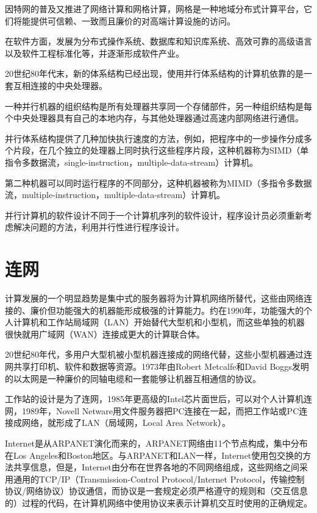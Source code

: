 因特网的普及又推进了网络计算和网格计算，网格是一种地域分布式计算平台，它们将能提供可信赖、一致而且廉价的对高端计算设施的访问。

在软件方面，发展为分布式操作系统、数据库和知识库系统、高效可靠的高级语言以及软件工程标准化等，并逐渐形成软件产业。

20世纪80年代末，新的体系结构已经出现，使用并行体系结构的计算机依靠的是一套互相连接的中央处理器。

一种并行机器的组织结构是所有处理器共享同一个存储部件，另一种组织结构是每个中央处理器具有自己的本地内存，与其他处理器通过高速内部网络进行通信。

并行体系结构提供了几种加快执行速度的方法，例如，把程序中的一步操作分成多个片段，在几个独立的处理器上同时执行这些程序片段，这种机器称为SIMD（单指令多数据流，single-instruction，multiple-data-stream）计算机。

第二种机器可以同时运行程序的不同部分，这种机器被称为MIMD（多指令多数据流，multiple-instruction，multiple-data-stream）计算机。

并行计算机的软件设计不同于一个计算机序列的软件设计，程序设计员必须重新考虑解决问题的方法，利用并行性进行程序设计。

\chapter{连网}

计算发展的一个明显趋势是集中式的服务器将为计算机网络所替代，这些由网络连接的、廉价但功能强大的机器能形成极强的计算能力。约在1990年，功能强大的个人计算机和工作站局域网（LAN）开始替代大型机和小型机，而这些单独的机器很快就用广域网（WAN）连接成更大的计算联合体。

20世纪80年代，多用户大型机被小型机器连接成的网络代替，这些小型机器通过连网共享打印机、软件和数据等资源。1973年由Robert Metcalfe和David Boggs发明的以太网是一种廉价的同轴电缆和一套能够让机器互相通信的协议。

工作站的设计是为了连网，1985年更高级的Intel芯片面世后，可以对个人计算机连网，1989年，Novell Netware用文件服务器把PC连接在一起，而把工作站或PC连接成网络，就形成了LAN（局域网，Local Area Network）。

Internet是从ARPANET演化而来的，ARPANET网络由11个节点构成，集中分布在Los Angeles和Boston地区。与ARPANET和LAN一样，Internet使用包交换的方法共享信息，但是，Internet由分布在世界各地的不同网络组成，这些网络之间采用通用的TCP/IP（Transmission-Control Protocol/Internet Protocol，传输控制协议/网络协议）协议通信，而协议是一套规定必须严格遵守的规则和（交互信息的）过程的代码，在计算机网络中使用协议来表示计算机交互时使用的正确规定。

